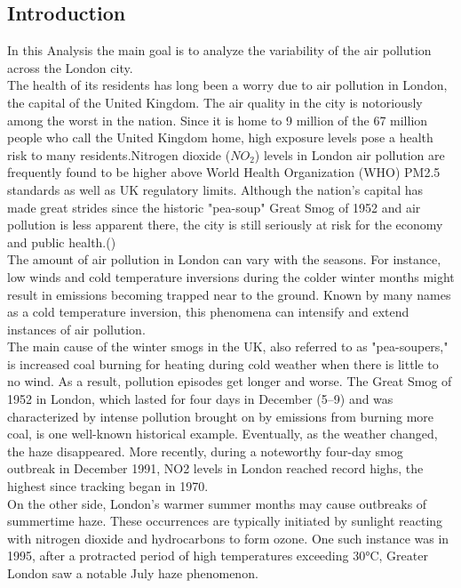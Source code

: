 \documentclass{article}
\begin{document}
	
	\begin{center}
		\section{Introduction}
	\end{center}
	In this Analysis the main goal is to analyze the variability of the air pollution across the London
	city.\\ 
	
	The health of its residents has long been a worry due to air pollution in London, the capital of the United Kingdom. The air quality in the city is notoriously among the worst in the nation. Since it is home to 9 million of the 67 million people who call the United Kingdom home, high exposure levels pose a health risk to many residents.Nitrogen dioxide ($NO_2$) levels in London air pollution are frequently found to be higher above World Health Organization (WHO) PM2.5 standards as well as UK regulatory limits. Although the nation's capital has made great strides since the historic "pea-soup" Great Smog of 1952 and air pollution is less apparent there, the city is still seriously at risk for the economy and public health.(\textcite{siteairquality})\\
	
	The amount of air pollution in London can vary with the seasons. For instance, low winds and cold temperature inversions during the colder winter months might result in emissions becoming trapped near to the ground. Known by many names as a cold temperature inversion, this phenomena can intensify and extend instances of air pollution.\\
	
	The main cause of the winter smogs in the UK, also referred to as "pea-soupers," is increased coal burning for heating during cold weather when there is little to no wind. As a result, pollution episodes get longer and worse. The Great Smog of 1952 in London, which lasted for four days in December (5–9) and was characterized by intense pollution brought on by emissions from burning more coal, is one well-known historical example. Eventually, as the weather changed, the haze disappeared. More recently, during a noteworthy four-day smog outbreak in December 1991, NO2 levels in London reached record highs, the highest since tracking began in 1970.\\
	
	On the other side, London's warmer summer months may cause outbreaks of summertime haze. These occurrences are typically initiated by sunlight reacting with nitrogen dioxide and hydrocarbons to form ozone. One such instance was in 1995, after a protracted period of high temperatures exceeding 30°C, Greater London saw a notable July haze phenomenon.
	\newpage
	
\end{document}

